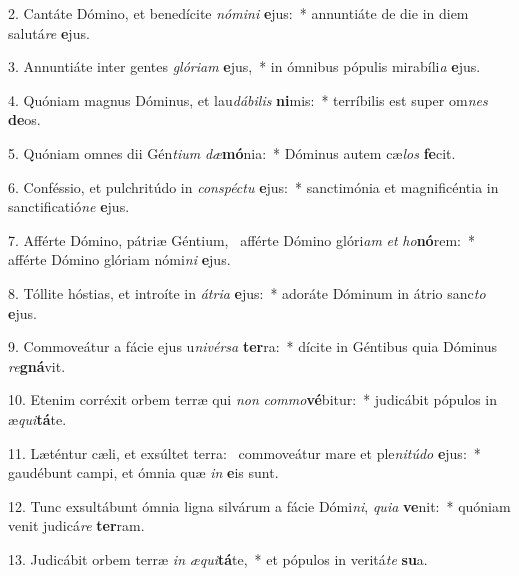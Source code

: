 2. Cantáte Dómino, et benedícite \textit{nó}\textit{mi}\textit{ni} \textbf{e}jus:~*  annuntiáte de die in diem salutá\textit{re} \textbf{e}jus.\

3. Annuntiáte inter gentes \textit{gló}\textit{ri}\textit{am} \textbf{e}jus,~*  in ómnibus pópulis mirabíli\textit{a} \textbf{e}jus.\

4. Quóniam magnus Dóminus, et lau\textit{dá}\textit{bi}\textit{lis} \textbf{ni}mis:~*  terríbilis est super om\textit{nes} \textbf{de}os.\

5. Quóniam omnes dii Gén\textit{ti}\textit{um} \textit{dæ}\textbf{mó}nia:~*  Dóminus autem cæ\textit{los} \textbf{fe}cit.\

6. Conféssio, et pulchritúdo in \textit{con}\textit{spéc}\textit{tu} \textbf{e}jus:~*  sanctimónia et magnificéntia in sanctificatió\textit{ne} \textbf{e}jus.\

7. Afférte Dómino, pátriæ Géntium, \dag\  afférte Dómino glóri\textit{am} \textit{et} \textit{ho}\textbf{nó}rem:~*  afférte Dómino glóriam nómi\textit{ni} \textbf{e}jus.\

8. Tóllite hóstias, et introíte in \textit{á}\textit{tri}\textit{a} \textbf{e}jus:~*  adoráte Dóminum in átrio sanc\textit{to} \textbf{e}jus.\

9. Commoveátur a fácie ejus u\textit{ni}\textit{vér}\textit{sa} \textbf{ter}ra:~*  dícite in Géntibus quia Dóminus \textit{re}\textbf{gná}vit.\

10. Etenim corréxit orbem terræ qui \textit{non} \textit{com}\textit{mo}\textbf{vé}bitur:~*  judicábit pópulos in æ\textit{qui}\textbf{tá}te.\

11. Læténtur cæli, et exsúltet terra: \dag\  commoveátur mare et ple\textit{ni}\textit{tú}\textit{do} \textbf{e}jus:~*  gaudébunt campi, et ómnia quæ \textit{in} \textbf{e}is sunt.\

12. Tunc exsultábunt ómnia ligna silvárum a fácie Dómi\textit{ni}, \textit{qui}\textit{a} \textbf{ve}nit:~*  quóniam venit judicá\textit{re} \textbf{ter}ram.\

13. Judicábit orbem terræ \textit{in} \textit{æ}\textit{qui}\textbf{tá}te,~*  et pópulos in veritá\textit{te} \textbf{su}a.\

